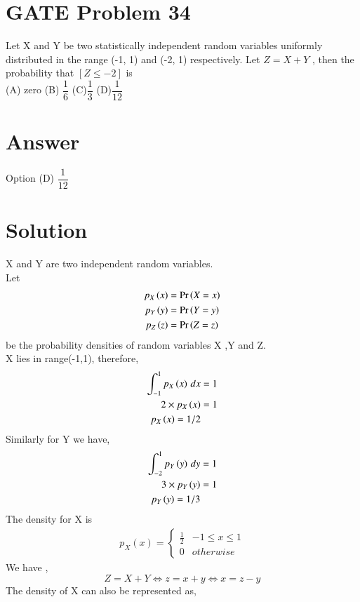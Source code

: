 \documentclass[journal,12pt,twocolumn]{IEEEtran}
\begin{document}
\section{GATE Problem 34}
Let X and Y be two statistically independent random variables uniformly distributed in the range (-1, 1) and (-2, 1) respectively. Let $Z = X +Y$ , then the probability that $[Z \leq -2]$ is \\
(A) zero         \hfill  (B) $\dfrac{1}{6}$  \hfill
(C)$\dfrac{1}{3}$      \hfill       (D)$\dfrac{1}{12}$  
\section{Answer}
Option (D) $\dfrac{1}{12}$
\section{Solution}
X and Y are two independent random variables. \\
Let
\begin{align}
    p_X\left(x\right) &= \Pr\left(X=x\right) \\
    p_Y\left(y\right) &= \Pr\left(Y=y\right)  \\
    p_Z\left(z\right) &= \Pr\left(Z=z\right)
\end{align}
be the probability densities of random variables X ,Y and Z. \\
X lies in range(-1,1), therefore,
\begin{align}
    \int_{-1}^{1} p_X\left(x\right) \,dx  &=1 \\
    2 \times p_X\left(x\right)  &= 1 \\
     p_X\left(x\right) =1 /2
\end{align}
Similarly for Y we have,
\begin{align}
    \int_{-2}^{1} p_Y\left(y\right) \,dy  &=1 \\
    3 \times p_Y\left(y\right)  &= 1  \\
     p_Y\left(y\right) =1 /3
\end{align}
The density for X is \\
\begin{align}
\label{eq:_pdf_x}
p_{X}(x)  = 
\begin{cases}
\frac{1}{2} & -1 \le x \le 1
\\
0 & otherwise
\end{cases}
\end{align}
We have ,
\begin{equation}
    Z= X+Y \iff z= x+ y \iff x = z-y
\end{equation}
The density of X can also be represented as,
\end{document}
